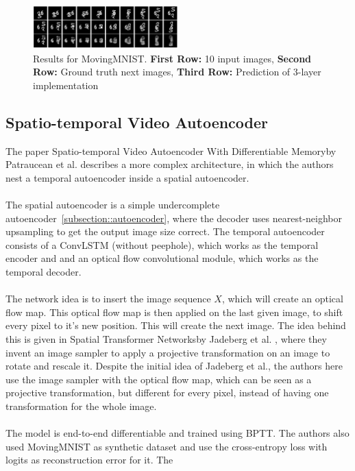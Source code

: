   \begin{figure}[H]
   \includegraphics[width=0.5\textwidth]{../Images/shi_results_mnist.png}
   \centering
   \caption{Results for MovingMNIST. \textbf{First Row:} 10 input images, \textbf{Second Row:} Ground truth next images, \textbf{Third Row:} Prediction of 3-layer implementation \cite{Shi2015}}
   \label{fig:convlstm_results}
  \end{figure}
 
 \subsection{Spatio-temporal Video Autoencoder}
  The paper \glqq Spatio-temporal Video Autoencoder With Differentiable Memory\grqq by Patraucean et al. \cite{Patraucean2015} describes a more complex architecture, in which the authors
  nest a temporal autoencoder inside a spatial autoencoder.
  \\\\  
  The spatial autoencoder is a simple undercomplete autoencoder~\ref{subsection::autoencoder}, where the decoder uses nearest-neighbor
  upsampling to get the output image size correct. The temporal autoencoder consists of a ConvLSTM (without peephole), which works as the temporal 
  encoder and and an optical flow convolutional module, which works
  as the temporal decoder.
  \\\\
  The network idea is to insert the image sequence $X$, which will create an optical flow map. This optical flow map is then applied on the last given image, to 
  shift every pixel to it's new position. This will create the next image. The idea behind this is given in \glqq Spatial Transformer Networks\grqq by Jadeberg et 
  al. \cite{Jadeberg2015}, where they invent an image sampler to apply a projective transformation on an image to rotate and rescale it. Despite the initial idea
  of Jadeberg et al., the authors here use the image sampler with the optical flow map, which can be seen as a projective transformation, but different for every 
  pixel, instead of having one transformation for the whole image.
  \\\\
  The model is end-to-end differentiable and trained using BPTT. The authors also used MovingMNIST as synthetic dataset and use the cross-entropy loss with logits as reconstruction error for it. The 
